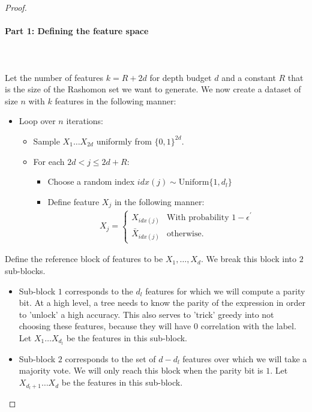 \begin{proof}
\paragraph{Part 1: Defining the feature space}\leavevmode\\\\
    Let the number of features $k = R + 2d$ for depth budget $d$ and a constant $R$ that is the size of the Rashomon set we want to generate. We now create a dataset of size $n$ with $k$ features in the following manner:
    \begin{itemize}
        \item Loop over $n$ iterations: 
        \begin{itemize}
            \item Sample $X_1\ldots X_{2d}$ uniformly from $\{0,1\}^{2d}$.
            \item For each $2d < j \leq 2d+R$:
            \begin{itemize}
                \item Choose a random index $idx(j) \sim \textrm{Uniform}\{1,d_l\}$
                \item Define feature $X_j$ in the following manner: 
                \begin{align}
                \label{eqn:x_j}
                    X_j = \begin{cases}
                        X_{idx(j)} & \textrm{With probability $1-\epsilon^\prime$}\\
                        \bar{X}_{idx(j)} & \textrm{otherwise.}
                    \end{cases}
                \end{align}
            \end{itemize}
        \end{itemize}
    \end{itemize}
    Define the reference block of features to be $X_1,\ldots, X_d$. We break this block into $2$ sub-blocks.
    \begin{itemize}
        \item Sub-block $1$ corresponds to the $d_l$ features for which we will compute a parity bit. At a high level, a tree needs to know the parity of the expression in order to 'unlock' a high accuracy. This also serves to 'trick' greedy into not choosing these features, because they will have $0$ correlation with the label. Let $X_{1}\ldots X_{d_l}$ be the features in this sub-block.
        \item Sub-block $2$ corresponds to the set of $d-d_l$ features over which we will take a majority vote. We will only reach this block when the parity bit is $1$. Let $X_{d_l+1}\ldots X_{d}$ be the features in this sub-block.
    \end{itemize}

\end{proof}

